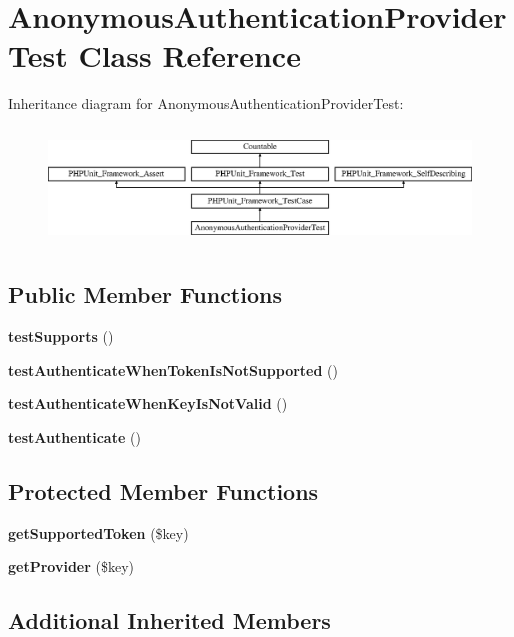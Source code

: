 \section{Anonymous\+Authentication\+Provider\+Test Class Reference}
\label{class_symfony_1_1_component_1_1_security_1_1_core_1_1_tests_1_1_authentication_1_1_provider_1_1_272e9630a9f813a12ed538b0a109c304}
Inheritance diagram for Anonymous\+Authentication\+Provider\+Test\+:\begin{figure}[H]
\begin{center}
\leavevmode
\includegraphics[height=3.137255cm]{class_symfony_1_1_component_1_1_security_1_1_core_1_1_tests_1_1_authentication_1_1_provider_1_1_272e9630a9f813a12ed538b0a109c304}
\end{center}
\end{figure}
\subsection*{Public Member Functions}
\begin{DoxyCompactItemize}
\item 
{\bf test\+Supports} ()
\item 
{\bf test\+Authenticate\+When\+Token\+Is\+Not\+Supported} ()
\item 
{\bf test\+Authenticate\+When\+Key\+Is\+Not\+Valid} ()
\item 
{\bf test\+Authenticate} ()
\end{DoxyCompactItemize}
\subsection*{Protected Member Functions}
\begin{DoxyCompactItemize}
\item 
{\bf get\+Supported\+Token} (\$key)
\item 
{\bf get\+Provider} (\$key)
\end{DoxyCompactItemize}
\subsection*{Additional Inherited Members}



